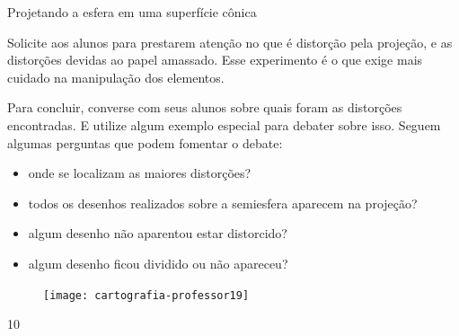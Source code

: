 \begin{sugestions}{Projetando a esfera em uma superfície cônica}
{


  Solicite aos alunos para prestarem atenção no que é distorção pela projeção, e as distorções devidas ao papel amassado. Esse experimento é o que exige mais cuidado na manipulação dos elementos.

  Para concluir, converse com seus alunos sobre quais foram as distorções encontradas. E  utilize algum exemplo especial para debater sobre isso. Seguem algumas perguntas que podem fomentar o debate:

  \begin{itemize}
  \item onde se localizam as maiores distorções?
  \item todos os desenhos realizados sobre a semiesfera aparecem na projeção?
  \item algum desenho não aparentou estar distorcido?
  \item algum desenho ficou dividido ou não apareceu?
  \end{itemize}

  \begin{figure}[H]
  \centering
  
  \texttt{[image: cartografia-professor19]}
  \end{figure}



}{1}{0}
\end{sugestions}


\label{Pconica}

